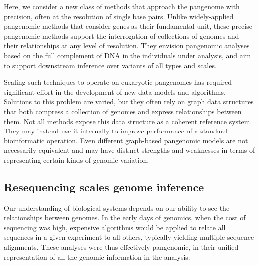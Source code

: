 Here, we consider a new class of methods that approach the pangenome with precision, often at the resolution of single base pairs.
Unlike widely-applied pangenomic methods that consider genes as their fundamental unit, these precise pangenomic methods support the interrogation of collections of genomes and their relationships at any level of resolution.
They envision pangenomic analyses based on the full complement of DNA in the individuals under analysis, and aim to support downstream inference over variants of all types and scales.

Scaling such techniques to operate on eukaryotic pangenomes has required significant effort in the development of new data models and algorithms.
Solutions to this problem are varied, but they often rely on graph data structures that both compress a collection of genomes and express relationships between them.
Not all methods expose this data structure as a coherent reference system.
They may instead use it internally to improve performance of a standard bioinformatic operation.
Even different graph-based pangenomic models are not necessarily equivalent and may have distinct strengths and weaknesses in terms of representing certain kinds of genomic variation.


\subsection{Resequencing scales genome inference}

Our understanding of biological systems depends on our ability to see the relationships between genomes.
In the early days of genomics, when the cost of sequencing was high, expensive algorithms would be applied to relate all sequences in a given experiment to all others, typically yielding multiple sequence alignments.
These analyses were thus effectively pangenomic, in their unified representation of all the genomic information in the analysis.

